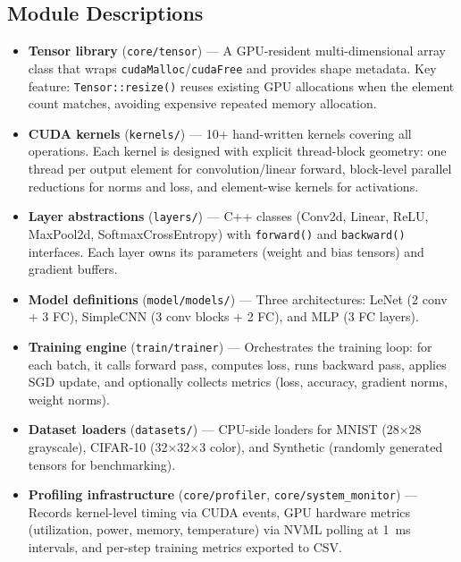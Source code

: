 \documentclass[10pt,twocolumn,letterpaper]{article}
\begin{document}
\subsection{Module Descriptions}

\begin{itemize}[leftmargin=*]
  \item \textbf{Tensor library} (\texttt{core/tensor}) --- A GPU-resident multi-dimensional array class that wraps \texttt{cudaMalloc}/\texttt{cudaFree} and provides shape metadata.
  Key feature: \texttt{Tensor::resize()} reuses existing GPU allocations when the element count matches, avoiding expensive repeated memory allocation.

  \item \textbf{CUDA kernels} (\texttt{kernels/}) --- 10+ hand-written kernels covering all operations.
  Each kernel is designed with explicit thread-block geometry: one thread per output element for convolution/linear forward, block-level parallel reductions for norms and loss, and element-wise kernels for activations.

  \item \textbf{Layer abstractions} (\texttt{layers/}) --- C++ classes (Conv2d, Linear, ReLU, MaxPool2d, SoftmaxCrossEntropy) with \texttt{forward()} and \texttt{backward()} interfaces. Each layer owns its parameters (weight and bias tensors) and gradient buffers.

  \item \textbf{Model definitions} (\texttt{model/models/}) --- Three architectures: LeNet (2 conv + 3 FC), SimpleCNN (3 conv blocks + 2 FC), and MLP (3 FC layers).

  \item \textbf{Training engine} (\texttt{train/trainer}) --- Orchestrates the training loop: for each batch, it calls forward pass, computes loss, runs backward pass, applies SGD update, and optionally collects metrics (loss, accuracy, gradient norms, weight norms).

  \item \textbf{Dataset loaders} (\texttt{datasets/}) --- CPU-side loaders for MNIST (28$\times$28 grayscale), CIFAR-10 (32$\times$32$\times$3 color), and Synthetic (randomly generated tensors for benchmarking).

  \item \textbf{Profiling infrastructure} (\texttt{core/profiler}, \texttt{core/system\_monitor}) --- Records kernel-level timing via CUDA events, GPU hardware metrics (utilization, power, memory, temperature) via NVML polling at 1~ms intervals, and per-step training metrics exported to CSV.
\end{itemize}
\end{document}
